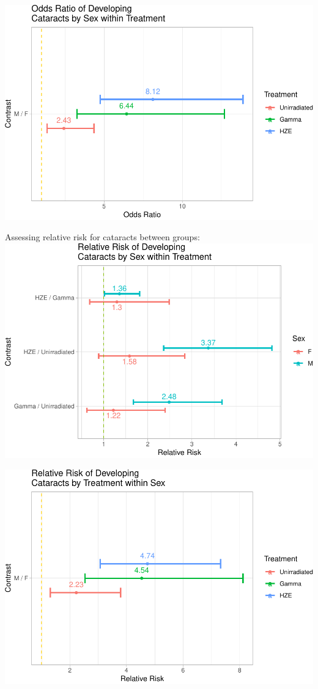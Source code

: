 \documentclass[
]{article}
\begin{document}
\includegraphics{final_report_files/figure-latex/oddsr2-1.pdf}

Assessing relative risk for cataracts between groups:\\
\includegraphics{final_report_files/figure-latex/RR-1.pdf}

\includegraphics{final_report_files/figure-latex/RR1-1.pdf}
\end{document}
